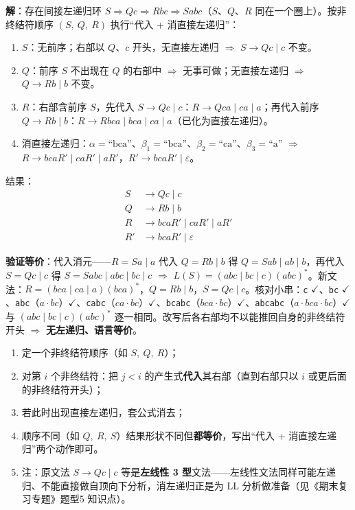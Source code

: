 \documentclass[12pt,a4paper,fontset=windows]{ctexart}
\newcommand{\ok}{\ensuremath{\checkmark}}
\newcommand{\imp}{\ensuremath{\Rightarrow}}
\begin{document}
\textbf{解}：存在间接左递归环 $S \Rightarrow Qc \Rightarrow Rbc \Rightarrow Sabc$（$S$、$Q$、$R$ 同在一个圈上）。按非终结符顺序 $(S,\ Q,\ R)$ 执行``代入 + 消直接左递归''：
\begin{enumerate}
\item \textbf{$S$}：无前序；右部以 $Q$、$c$ 开头，无直接左递归 \imp{} $S \to Qc \mid c$ 不变。
\item \textbf{$Q$}：前序 $S$ 不出现在 $Q$ 的右部中 \imp{} 无事可做；无直接左递归 \imp{} $Q \to Rb \mid b$ 不变。
\item \textbf{$R$}：右部含前序 $S$，先代入 $S \to Qc \mid c$：$R \to Qca \mid ca \mid a$；再代入前序 $Q \to Rb \mid b$：\textbf{$R \to Rbca \mid bca \mid ca \mid a$}（已化为直接左递归）。
\item 消直接左递归：$\alpha=\text{“bca”}$、$\beta_1=\text{“bca”}$、$\beta_2=\text{“ca”}$、$\beta_3=\text{“a”}$ \imp{} $R \to bcaR' \mid caR' \mid aR'$，$R' \to bcaR' \mid \varepsilon$。
\end{enumerate}
结果：
\[
\begin{aligned}
S  &\to Q c \mid c\\
Q  &\to R b \mid b\\
R  &\to b c a R' \mid c a R' \mid a R'\\
R' &\to b c a R' \mid \varepsilon
\end{aligned}
\]

\textbf{验证等价}：代入消元——$R = Sa \mid a$ 代入 $Q = Rb \mid b$ 得 $Q = Sab \mid ab \mid b$，再代入 $S = Qc \mid c$ 得 $S = Sabc \mid abc \mid bc \mid c$ \imp{} $L(S)=(abc \mid bc \mid c)(abc)^*$。新文法：$R = (bca \mid ca \mid a)(bca)^*$，$Q = Rb \mid b$，$S = Qc \mid c$。核对小串：\texttt{c} \ok、\texttt{bc} \ok、\texttt{abc}（$a \cdot bc$）\ok、\texttt{cabc}（$ca \cdot bc$）\ok、\texttt{bcabc}（$bca \cdot bc$）\ok、\texttt{abcabc}（$a \cdot bca \cdot bc$）\ok 与 $(abc \mid bc \mid c)(abc)^*$ 逐一相同。改写后各右部均不以能推回自身的非终结符开头 \imp{} \textbf{无左递归、语言等价}。

\begin{tipbox}
\begin{enumerate}
\item 定一个非终结符顺序（如 $S,\ Q,\ R$）；
\item 对第 $i$ 个非终结符：把 $j < i$ 的产生式\textbf{代入}其右部（直到右部只以 $i$ 或更后面的非终结符开头）；
\item 若此时出现直接左递归，套公式消去；
\item 顺序不同（如 $Q,\ R,\ S$）结果形状不同但\textbf{都等价}，写出``代入 + 消直接左递归''两个动作即可。
\item 注：原文法 $S \to Qc \mid c$ 等是\textbf{左线性 3 型}文法——左线性文法同样可能左递归、不能直接做自顶向下分析，消左递归正是为 LL 分析做准备（见《期末复习专题》题型5 知识点）。
\end{enumerate}
\end{tipbox}
\end{document}
